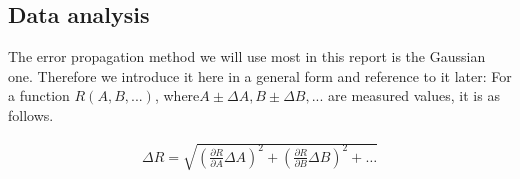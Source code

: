 \subsection{Data analysis}

The error propagation method we will use most in this report
is the Gaussian one. Therefore we introduce it here in a general form and reference to it
later: For a function $R(A,B, . . . )$, where$ A \pm \Delta A,B \pm \Delta B, . . .$ are measured values, it is
as follows.

\begin{align}
\Delta R = \sqrt{\left(\frac{\partial R}{\partial A} \Delta A\right)^2 + \left(\frac{\partial R}{\partial B} \Delta B\right)^2 + \dots}
\label{eq::gauss}
\end{align}

